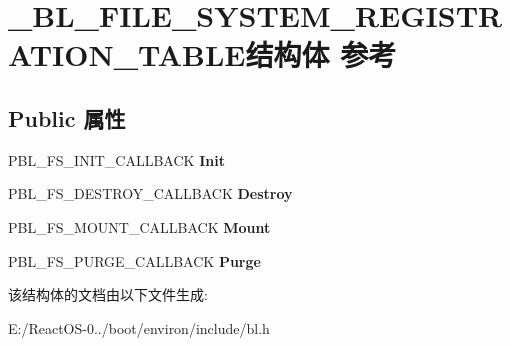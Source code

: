 \hypertarget{struct___b_l___f_i_l_e___s_y_s_t_e_m___r_e_g_i_s_t_r_a_t_i_o_n___t_a_b_l_e}{}\section{\+\_\+\+B\+L\+\_\+\+F\+I\+L\+E\+\_\+\+S\+Y\+S\+T\+E\+M\+\_\+\+R\+E\+G\+I\+S\+T\+R\+A\+T\+I\+O\+N\+\_\+\+T\+A\+B\+L\+E结构体 参考}
\label{struct___b_l___f_i_l_e___s_y_s_t_e_m___r_e_g_i_s_t_r_a_t_i_o_n___t_a_b_l_e}
\subsection*{Public 属性}
\begin{DoxyCompactItemize}
\item 
\mbox{\label{struct___b_l___f_i_l_e___s_y_s_t_e_m___r_e_g_i_s_t_r_a_t_i_o_n___t_a_b_l_e_a63d3373521f88251965303e5f55a1961}} 
P\+B\+L\+\_\+\+F\+S\+\_\+\+I\+N\+I\+T\+\_\+\+C\+A\+L\+L\+B\+A\+CK {\bfseries Init}
\item 
\mbox{\label{struct___b_l___f_i_l_e___s_y_s_t_e_m___r_e_g_i_s_t_r_a_t_i_o_n___t_a_b_l_e_a551064bfc391a864b5f297935e65f0af}} 
P\+B\+L\+\_\+\+F\+S\+\_\+\+D\+E\+S\+T\+R\+O\+Y\+\_\+\+C\+A\+L\+L\+B\+A\+CK {\bfseries Destroy}
\item 
\mbox{\label{struct___b_l___f_i_l_e___s_y_s_t_e_m___r_e_g_i_s_t_r_a_t_i_o_n___t_a_b_l_e_a50f690d9a2d685291e3e04587de20fd8}} 
P\+B\+L\+\_\+\+F\+S\+\_\+\+M\+O\+U\+N\+T\+\_\+\+C\+A\+L\+L\+B\+A\+CK {\bfseries Mount}
\item 
\mbox{\label{struct___b_l___f_i_l_e___s_y_s_t_e_m___r_e_g_i_s_t_r_a_t_i_o_n___t_a_b_l_e_a38770adad25d26572b727bea31a6bc5b}} 
P\+B\+L\+\_\+\+F\+S\+\_\+\+P\+U\+R\+G\+E\+\_\+\+C\+A\+L\+L\+B\+A\+CK {\bfseries Purge}
\end{DoxyCompactItemize}


该结构体的文档由以下文件生成\+:\begin{DoxyCompactItemize}
\item 
E\+:/\+React\+O\+S-\/0../boot/environ/include/bl.\+h\end{DoxyCompactItemize}
